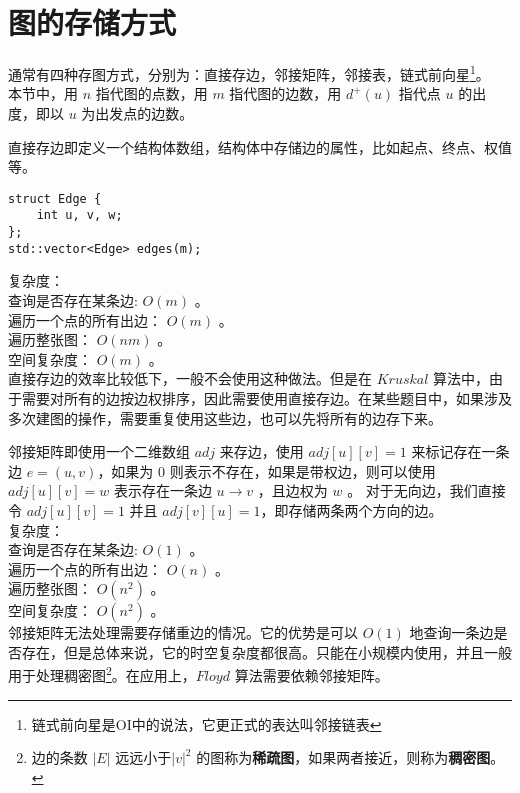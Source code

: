 \documentclass{beamer}
\newcommand{\fdf}[1]{\alert{\textbf{#1}}}
\begin{document}
\section{图的存储方式}
\begin{frame}
通常有四种存图方式，分别为：直接存边，邻接矩阵，邻接表，链式前向星\footnote{链式前向星是OI中的说法，它更正式的表达叫邻接链表}。 \\ 
本节中，用 $n$ 指代图的点数，用 $m$ 指代图的边数，用 $d^+(u)$ 指代点 $u$ 的出度，即以 $u$ 为出发点的边数。
\end{frame}
\begin{frame}[fragile]
直接存边即定义一个结构体数组，结构体中存储边的属性，比如起点、终点、权值等。\\ 
\begin{onlyenv}
\begin{verbatim}
struct Edge {
    int u, v, w;
};
std::vector<Edge> edges(m);
\end{verbatim}
\end{onlyenv}
复杂度： \\
查询是否存在某条边: $O(m)$ 。\\ 
遍历一个点的所有出边： $O(m)$ 。\\ 
遍历整张图： $O(nm)$ 。 \\ 
空间复杂度： $O(m)$ 。 \\ 
直接存边的效率比较低下，一般不会使用这种做法。但是在 $Kruskal$ 算法中，由于需要对所有的边按边权排序，因此需要使用直接存边。在某些题目中，如果涉及多次建图的操作，需要重复使用这些边，也可以先将所有的边存下来。
\end{frame}
\begin{frame}
邻接矩阵即使用一个二维数组 $adj$ 来存边，使用 $adj[u][v] = 1$ 来标记存在一条边 $e = (u, v)$，如果为 $0$ 则表示不存在，如果是带权边，则可以使用 $adj[u][v] = w$ 表示存在一条边 $u \rightarrow v$ ，且边权为 $w$ 。 
对于无向边，我们直接令 $adj[u][v] = 1$ 并且 $adj[v][u] = 1$，即存储两条两个方向的边。 \\
复杂度：\\
查询是否存在某条边: $O(1)$ 。\\ 
遍历一个点的所有出边： $O(n)$ 。\\ 
遍历整张图： $O(n^2)$ 。 \\ 
空间复杂度： $O(n^2)$ 。 \\ 
邻接矩阵无法处理需要存储重边的情况。它的优势是可以 $O(1)$ 地查询一条边是否存在，但是总体来说，它的时空复杂度都很高。只能在小规模内使用，并且一般用于处理稠密图\footnote{边的条数 $| E |$ 远远小于$| v |^2$ 的图称为\fdf{稀疏图}，如果两者接近，则称为\fdf{稠密图}。}。在应用上，$Floyd$ 算法需要依赖邻接矩阵。
\end{frame}
\end{document}
